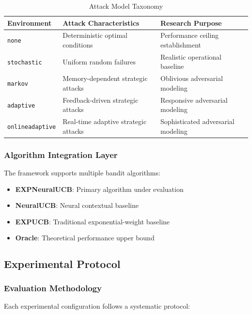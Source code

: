 \documentclass[11pt,a4paper]{article}
\begin{document}
\begin{table}[H]
\centering
\caption{Attack Model Taxonomy}
\begin{tabular}{|l|p{5cm}|p{6cm}|}
\hline
\textbf{Environment} & \textbf{Attack Characteristics} & \textbf{Research Purpose} \\
\hline
\hline
\texttt{none} & Deterministic optimal conditions & Performance ceiling establishment \\
\hline
\texttt{stochastic} & Uniform random failures & Realistic operational baseline \\
\hline
\texttt{markov} & Memory-dependent strategic attacks & Oblivious adversarial modeling \\
\hline
\texttt{adaptive} & Feedback-driven strategic attacks & Responsive adversarial modeling \\
\hline
\texttt{onlineadaptive} & Real-time adaptive strategic attacks & Sophisticated adversarial modeling \\
\hline
\end{tabular}
\end{table}

\subsubsection{Algorithm Integration Layer}

The framework supports multiple bandit algorithms:

\begin{itemize}
\item \textbf{EXPNeuralUCB}: Primary algorithm under evaluation
\item \textbf{NeuralUCB}: Neural contextual baseline
\item \textbf{EXPUCB}: Traditional exponential-weight baseline  
\item \textbf{Oracle}: Theoretical performance upper bound
\end{itemize}

\subsection{Experimental Protocol}

\subsubsection{Evaluation Methodology}

Each experimental configuration follows a systematic protocol:
\end{document}
